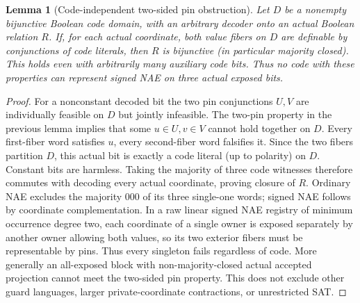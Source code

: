\documentclass[11pt]{article}
\newtheorem{lemma}[theorem]{Lemma}
\begin{document}
\begin{lemma}[Code-independent two-sided pin obstruction]\label{lem:gd25-pin}
Let $D$ be a nonempty bijunctive Boolean code domain, with an arbitrary decoder onto an actual Boolean relation $R$. If, for each actual coordinate, both value fibers on $D$ are definable by conjunctions of code literals, then $R$ is bijunctive (in particular majority closed). This holds even with arbitrarily many auxiliary code bits. Thus no code with these properties can represent signed NAE on three actual exposed bits.
\end{lemma}
\begin{proof}
For a nonconstant decoded bit the two pin conjunctions $U,V$ are individually feasible on $D$ but jointly infeasible. The two-pin property in the previous lemma implies that some $u\in U,v\in V$ cannot hold together on $D$. Every first-fiber word satisfies $u$, every second-fiber word falsifies it. Since the two fibers partition $D$, this actual bit is exactly a code literal (up to polarity) on $D$. Constant bits are harmless. Taking the majority of three code witnesses therefore commutes with decoding every actual coordinate, proving closure of $R$. Ordinary NAE excludes the majority $000$ of its three single-one words; signed NAE follows by coordinate complementation. In a raw linear signed NAE registry of minimum occurrence degree two, each coordinate of a single owner is exposed separately by another owner allowing both values, so its two exterior fibers must be representable by pins. Thus every singleton fails regardless of code. More generally an all-exposed block with non-majority-closed actual accepted projection cannot meet the two-sided pin property. This does not exclude other guard languages, larger private-coordinate contractions, or unrestricted SAT.
\end{proof}
\end{document}
